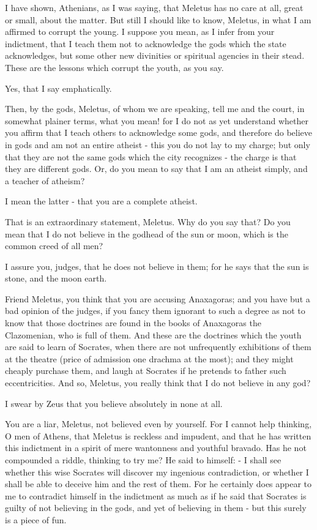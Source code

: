 \documentclass[11pt]{article}
\begin{document}
I have shown, Athenians, as I was saying, that Meletus has no care at all, great or small, about the matter. But still I should like to know, Meletus, in what I am affirmed to corrupt the young. I suppose you mean, as I infer from your indictment, that I teach them not to acknowledge the gods which the state acknowledges, but some other new divinities or spiritual agencies in their stead. These are the lessons which corrupt the youth, as you say.

Yes, that I say emphatically.

Then, by the gods, Meletus, of whom we are speaking, tell me and the court, in somewhat plainer terms, what you mean! for I do not as yet understand whether you affirm that I teach others to acknowledge some gods, and therefore do believe in gods and am not an entire atheist - this you do not lay to my charge; but only that they are not the same gods which the city recognizes - the charge is that they are different gods. Or, do you mean to say that I am an atheist simply, and a teacher of atheism?

I mean the latter - that you are a complete atheist.

That is an extraordinary statement, Meletus. Why do you say that? Do you mean that I do not believe in the godhead of the sun or moon, which is the common creed of all men?

I assure you, judges, that he does not believe in them; for he says that the sun is stone, and the moon earth.

Friend Meletus, you think that you are accusing Anaxagoras; and you have but a bad opinion of the judges, if you fancy them ignorant to such a degree as not to know that those doctrines are found in the books of Anaxagoras the Clazomenian, who is full of them. And these are the doctrines which the youth are said to learn of Socrates, when there are not unfrequently exhibitions of them at the theatre (price of admission one drachma at the most); and they might cheaply purchase them, and laugh at Socrates if he pretends to father such eccentricities. And so, Meletus, you really think that I do not believe in any god?

I swear by Zeus that you believe absolutely in none at all.

You are a liar, Meletus, not believed even by yourself. For I cannot help thinking, O men of Athens, that Meletus is reckless and impudent, and that he has written this indictment in a spirit of mere wantonness and youthful bravado. Has he not compounded a riddle, thinking to try me? He said to himself: - I shall see whether this wise Socrates will discover my ingenious contradiction, or whether I shall be able to deceive him and the rest of them. For he certainly does appear to me to contradict himself in the indictment as much as if he said that Socrates is guilty of not believing in the gods, and yet of believing in them - but this surely is a piece of fun.
\end{document}
